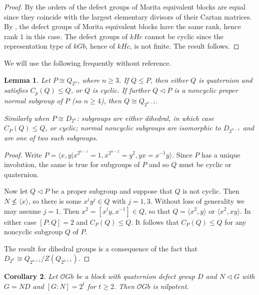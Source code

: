 \documentclass{amsart}
\theoremstyle{plain}\newtheorem{Theorem}{Theorem}[section]
\theoremstyle{plain}\newtheorem{Conjecture}[Theorem]{Conjecture}
\theoremstyle{plain}\newtheorem{Corollary}[Theorem]{Corollary}
\theoremstyle{plain}\newtheorem{Lemma}[Theorem]{Lemma}
\theoremstyle{plain}\newtheorem{Proposition}[Theorem]{Proposition}
\theoremstyle{definition}\newtheorem{Definition}[Theorem]{Definition}
\theoremstyle{definition}\newtheorem{Example}[Theorem]{Example}
\theoremstyle{definition}\newtheorem{Examples}[Theorem]{Examples}
\theoremstyle{definition}\newtheorem{Exercise}[Theorem]{Exercise}
\theoremstyle{definition}\newtheorem{Notation}[Theorem]{Notation}
\theoremstyle{definition}\newtheorem{Remark}[Theorem]{Remark}
\theoremstyle{definition}\newtheorem{Remarks}[Theorem]{Remarks}
\def\CO{{\mathcal{O}}}    \def\OPE{{\mathcal{O}(P\rtimes E)}}
\numberwithin{equation}{section}
\begin{document}
\begin{proof}
By \cite[Ch.~5, Thm.~11.6]{NT} the orders of the defect groups
of Morita equivalent blocks are equal since they coincide with the
largest elementary divisors of their Cartan matrices. By
\cite[Cor.~4.3]{Linvar}, the defect groups of Morita equivalent
blocks have the same rank, hence rank $1$ in this case. The defect
groups of $kHc$ cannot be cyclic since the representation type
of $kGb$, hence of $kHc$, is not finite. The result follows.
\end{proof}

We will use the following frequently without reference.

\begin{Lemma}
Let $P \cong Q_{2^n}$, where $n \geq 3$. If $Q \leq P$, then either $Q$ is quaternion and satisfies $C_p(Q)\leq Q$, or $Q$ is cyclic. If further $Q \lhd P$ is a noncyclic proper normal subgroup of $P$ (so $n \geq 4$), then $Q \cong Q_{2^{n-1}}$.

Similarly when $P \cong D_{2^n}$: subgroups are either dihedral, in which case $C_P(Q) \leq Q$, or cyclic; normal noncyclic subgroups are isomorphic to $D_{2^{n-1}}$ and are one of two such subgroups. 
\end{Lemma}


\begin{proof}
Write $P=\langle x,y|x^{2^{n-1}}=1, x^{2^{n-2}}=y^2, yx=x^{-1}y \rangle$. Since $P$ has a unique involution, the same is true for subgroups of $P$ and so $Q$ must be cyclic or quaternion. 

Now let $Q \lhd P$ be a proper subgroup and suppose that $Q$ is not cyclic. Then $N \not\leq \langle x \rangle$, so there is some $x^iy^j \in Q$ with $j=1,3$. Without loss of generality we may assume $j=1$. Then $x^2=[x^iy,x^{-1}] \in Q$, so that $Q=\langle x^2,y\rangle$ or $\langle x^2,xy\rangle$. In either case $[P:Q]=2$ and $C_P(Q) \leq Q$. It follows that $C_P(Q) \leq Q$ for any noncyclic subgroup $Q$ of $P$. 

The result for dihedral groups is a consequence of the fact that $D_{2^n} \cong Q_{2^{n+1}}/Z(Q_{2^{n+1}})$. 
\end{proof}

\begin{Corollary}
Let $\CO Gb$ be a block with quaternion defect group $D$ and $N \lhd G$ with $G=ND$ and $[G:N]=2^t$ for $t \geq 2$. Then $\CO Gb$ is nilpotent.      
\end{Corollary}
\end{document}
